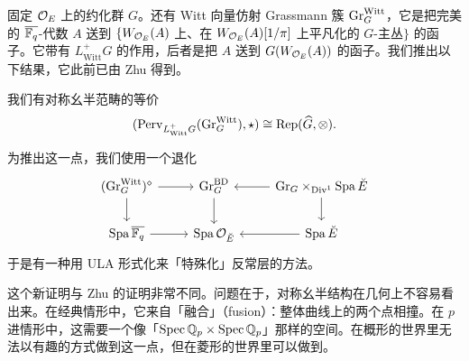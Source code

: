 固定 $\mathcal{O}_E$ 上的约化群 $G$。还有 Witt 向量仿射 Grassmann 簇 $\mathrm{Gr}_G^{\mathrm{Witt}}$，它是把完美的 $\overline{\mathbb{F}_q}$-代数 $A$ 送到 $\{W_{\mathcal{O}_E}(A)$ 上、在 $W_{\mathcal{O}_E}(A)[1/\pi]$ 上平凡化的 $G$-主丛$\}$ 的函子。它带有 $L^+_{\mathrm{Witt}}G$ 的作用，后者是把 $A$ 送到 $G(W_{\mathcal{O}_E}(A))$ 的函子。我们推出以下结果，它此前已由 Zhu 得到。

\begin{corollary}[Zhu]
我们有对称幺半范畴的等价
\[
(\operatorname{Perv}_{L^+_{\mathrm{Witt}}G}(\mathrm{Gr}_G^{\mathrm{Witt}}),\star)\cong\operatorname{Rep}(\widehat G,\otimes).
\]
\end{corollary}

为推出这一点，我们使用一个退化
\[
\begin{tikzcd}
(\Gr_G^{\mathrm{Witt}})^\diamond \arrow[r] \arrow[d] & \Gr_G^{\mathrm{BD}} \arrow[d] & \Gr_G\times_{\Div^1}\Spa\breveE \arrow[l] \arrow[d] \\
\Spa\ol{\Fq} \arrow[r] & \Spa\cO_{\breveE} & \Spa\breveE \arrow[l]
\end{tikzcd}
\]
于是有一种用 ULA 形式化来「特殊化」反常层的方法。

这个新证明与 Zhu 的证明非常不同。问题在于，对称幺半结构在几何上不容易看出来。在经典情形中，它来自「融合」（fusion）：整体曲线上的两个点相撞。在 $p$ 进情形中，这需要一个像「$\operatorname{Spec}\mathbb Q_p\times\operatorname{Spec}\mathbb Q_p$」那样的空间。在概形的世界里无法以有趣的方式做到这一点，但在菱形的世界里可以做到。
